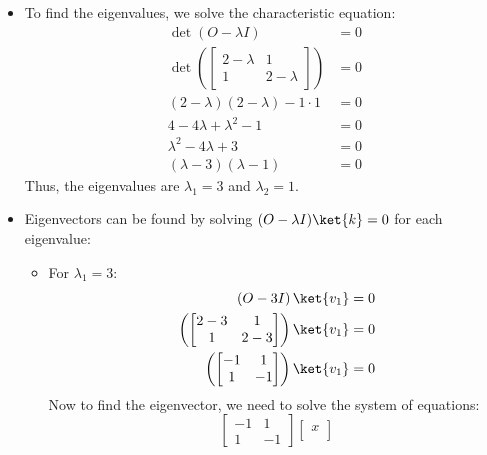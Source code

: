 \begin{itemize}
    \item To find the eigenvalues, we solve the characteristic equation:
    \begin{align*}
        \det\left(O - \lambda I\right) &= 0 \\
        \det\left(
            \begin{bmatrix}
                2 - \lambda & 1 \\
                1 & 2 - \lambda
            \end{bmatrix}
        \right) &= 0 \\
        \left(2 - \lambda\right)\left(2 - \lambda\right) - 1 \cdot 1 &= 0 \\
        4 - 4\lambda + \lambda^2 - 1 &= 0 \\
        \lambda^2 - 4\lambda + 3 &= 0 \\
        \left(\lambda - 3\right)\left(\lambda - 1\right) &= 0
    \end{align*}
    Thus, the eigenvalues are $\lambda_1 = 3$ and $\lambda_2 = 1$.
    \item Eigenvectors can be found by solving $(O - \lambda I)\ket{k} = 0$ for each eigenvalue:
    \begin{itemize}
        \item For $\lambda_1 = 3$:
        \begin{align*}
            \left(O - 3I\right)\ket{v_1} &= 0 \\
            \left(\begin{bmatrix}
                2 - 3 & 1 \\
                1 & 2 - 3
            \end{bmatrix}\right)\ket{v_1} &= 0 \\
            \left(\begin{bmatrix}
                -1 & 1 \\
                1 & -1
            \end{bmatrix}\right)\ket{v_1} &= 0
        \end{align*}
        Now to find the eigenvector, we need to solve the system of equations:
        \begin{equation*}
            \begin{bmatrix}
                -1 & 1 \\
                1 & -1
            \end{bmatrix} \begin{bmatrix}
                x \\

\end{bmatrix}
\end{equation*}
\end{itemize}
\end{itemize}

